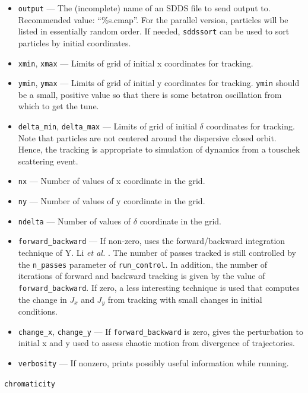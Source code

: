 \documentclass[11pt]{article}
\begin{document}
\begin{itemize}
\item \verb|output| --- The (incomplete) name of an SDDS file to send output to.  
 Recommended value: ``\%s.cmap''.  For the parallel version, particles will be listed in essentially
 random order.  If needed, \verb|sddssort| can be used to sort particles by initial coordinates.
\item \verb|xmin|, \verb|xmax| --- Limits of grid of initial x coordinates for tracking.             
\item \verb|ymin|, \verb|ymax| --- Limits of grid of initial y coordinates for tracking.             
 \verb|ymin| should be a small, positive value so that there                               
 is some betatron oscillation from which to get the tune.                      
\item \verb|delta_min|, \verb|delta_max| --- Limits of grid of initial $\delta$ coordinates
for tracking.  Note that particles are not centered around the dispersive closed orbit.  Hence,
the tracking is appropriate to simulation of dynamics from a touschek scattering event.
\item \verb|nx| --- Number of values of x coordinate in the grid.
\item \verb|ny| --- Number of values of y coordinate in the grid.
\item \verb|ndelta| --- Number of values of $\delta$ coordinate in the grid.
\item \verb|forward_backward| --- If non-zero, uses the forward/backward integration technique of Y. Li {\em et al.} 
  \cite{Li-arxiv-1912.00121}. The number of passes tracked is still controlled by the \verb|n_passes| parameter of 
  \verb|run_control|. In addition, the number of iterations of forward and backward tracking is given by the
  value of \verb|forward_backward|.
  If zero, a less interesting technique is used that computes the change in $J_x$ and $J_y$ from tracking with
  small changes in initial conditions.
\item \verb|change_x|, \verb|change_y| --- If  \verb|forward_backward| is zero, gives the perturbation to 
  initial x and y used to assess chaotic motion from divergence of trajectories.
\item \verb|verbosity| --- If nonzero, prints possibly useful information while running.
\end{itemize}

\newpage
\begin{center}{\Large\verb|chromaticity|}\end{center}
\end{document}
